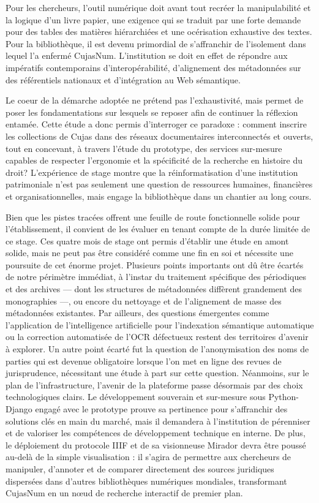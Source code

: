 Pour les chercheurs, l'outil numérique doit avant tout recréer la manipulabilité et la logique d'un livre papier, une exigence qui se traduit par une forte demande pour des tables des matières hiérarchiées et une océrisation exhaustive des textes. Pour la bibliothèque, il est devenu primordial de s'affranchir de l'isolement dans lequel l'a enfermé CujasNum. L'institution se doit en effet de répondre aux impératifs contemporains d'interopérabilité, d'alignement des métadonnées sur des référentiels nationaux et d'intégration au Web sémantique.

Le coeur de la démarche adoptée ne prétend pas l'exhaustivité, mais permet de poser les fondamentations sur lesquels se reposer afin de continuer la réflexion entamée. Cette étude a donc permis d'interroger ce paradoxe : comment inscrire les collections de Cujas dans des réseaux documentaires interconnectés et ouverts, tout en concevant, à travers l'étude du prototype, des services sur-mesure capables de respecter l'ergonomie et la spécificité de la recherche en histoire du droit? L'expérience de stage montre que la réinformatisation d'une institution patrimoniale n'est pas seulement une question de ressources humaines, financières et organisationnelles, mais engage la bibliothèque dans un chantier au long cours. 

Bien que les pistes tracées offrent une feuille de route fonctionnelle solide pour l'établissement, il convient de les évaluer en tenant compte de la durée limitée de ce stage. Ces quatre mois de stage ont permis d'établir une étude en amont solide, mais ne peut pas être considéré comme une fin en soi et nécessite une poursuite de cet énorme projet. Plusieurs points importants ont dû être écartés de notre périmètre immédiat, à l'instar du traitement spécifique des périodiques et des archives — dont les structures de métadonnées diffèrent grandement des monographies —, ou encore du nettoyage et de l'alignement de masse des métadonnées existantes. Par ailleurs, des questions émergentes comme l'application de l'intelligence artificielle pour l'indexation sémantique automatique ou la correction automatisée de l'\ac{OCR} défectueux restent des territoires d'avenir à explorer. Un autre point écarté fut la question de l'anonymisation des noms de parties qui est devenue obligatoire lorsque l'on met en ligne des revues de jurisprudence, nécessitant une étude à part sur cette question.
Néanmoins, sur le plan de l'infrastructure, l'avenir de la plateforme passe désormais par des choix technologiques clairs. Le développement souverain et sur-mesure sous Python-Django engagé avec le prototype prouve sa pertinence pour s'affranchir des solutions clés en main du marché, mais il demandera à l'institution de pérenniser et de valoriser les compétences de développement technique en interne. De plus, le déploiement du protocole \ac{IIIF} et de sa visionneuse Mirador devra être poussé au-delà de la simple visualisation : il s'agira de permettre aux chercheurs de manipuler, d'annoter et de comparer directement des sources juridiques dispersées dans d'autres bibliothèques numériques mondiales, transformant CujasNum en un nœud de recherche interactif de premier plan.

